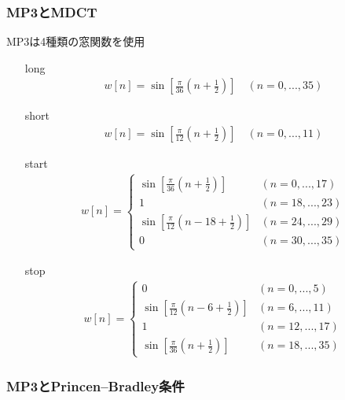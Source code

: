 \documentclass[14pt,xcolor=dvipsnames,table,dvipdfmx]{beamer}
\begin{document}
\begin{frame}[c]
    \frametitle{MP3とMDCT}
    MP3は4種類の窓関数を使用
    \footnotesize
    \begin{itemize}
        \item[long]
            \begin{align}
                w[n] = \sin\left[ \frac{\pi}{36} \left( n + \frac{1}{2} \right) \right] \quad (n = 0, ..., 35)
            \end{align}
        \item[short]
            \begin{align}
                w[n] = \sin\left[ \frac{\pi}{12} \left( n + \frac{1}{2} \right) \right] \quad (n = 0, ..., 11)
            \end{align}
        \item[start]
            \begin{align}
                w[n] =
                \left\{ \begin{array}{ll}
                    \sin\left[ \frac{\pi}{36} \left( n + \frac{1}{2} \right) \right] & (n = 0, ..., 17) \\
                    1 & (n = 18, ..., 23) \\
                    \sin\left[ \frac{\pi}{12} \left( n - 18 + \frac{1}{2} \right) \right] & (n = 24, ..., 29) \\
                    0 & (n = 30, ..., 35)
                \end{array}\right.
            \end{align}
        \item[stop]
            \begin{align}
                w[n] =
                \left\{ \begin{array}{ll}
                    0 & (n = 0, ..., 5) \\
                    \sin\left[ \frac{\pi}{12} \left( n - 6 + \frac{1}{2} \right) \right] & (n = 6, ..., 11) \\
                    1 & (n = 12, ..., 17) \\
                    \sin\left[ \frac{\pi}{36} \left( n + \frac{1}{2} \right) \right] & (n = 18, ..., 35)
                \end{array}\right.
            \end{align}
    \end{itemize}
\end{frame}

\begin{frame}[c]
    \frametitle{MP3とPrincen--Bradley条件}
\end{frame}
\end{document}
